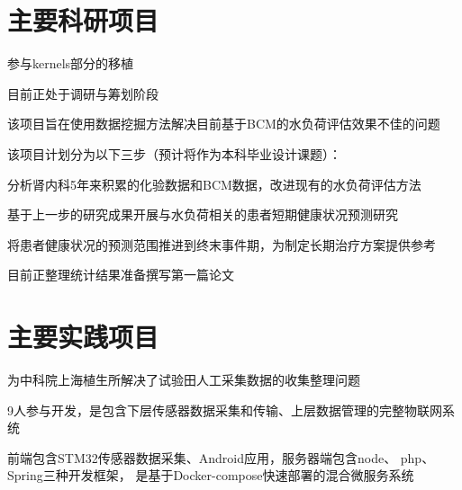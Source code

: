\documentclass[]{deedy-resume-openfont}
\begin{document}
\hfill
\begin{minipage}[t]{0.73\textwidth}


	\section{主要科研项目}
	\descript{}
	\vspace{\topsep}
	\begin{tightemize}
		\item 参与kernels部分的移植
		\item 目前正处于调研与筹划阶段
	\end{tightemize}
    \sectionsep

	\descript{}
    \begin{tightemize}
        \item 该项目旨在使用数据挖掘方法解决目前基于BCM的水负荷评估效果不佳的问题
        \item 该项目计划分为以下三步（预计将作为本科毕业设计课题）：
        \vspace{\topsep}
        \begin{tightemize}
            \item 分析肾内科5年来积累的化验数据和BCM数据，改进现有的水负荷评估方法
            \item 基于上一步的研究成果开展与水负荷相关的患者短期健康状况预测研究
            \item 将患者健康状况的预测范围推进到终末事件期，为制定长期治疗方案提供参考
        \end{tightemize}
        \vspace{\topsep}
		\item 目前正整理统计结果准备撰写第一篇论文
	\end{tightemize}
    \sectionsep

    \section{主要实践项目}
	\begin{tightemize}
		\item 为中科院上海植生所解决了试验田人工采集数据的收集整理问题
		\item 9人参与开发，是包含下层传感器数据采集和传输、上层数据管理的完整物联网系统
		\item 前端包含STM32传感器数据采集、Android应用，服务器端包含node、 php、 Spring三种开发框架， 是基于Docker-compose快速部署的混合微服务系统
	\end{tightemize}
	\sectionsep


\end{minipage}
\end{document}
